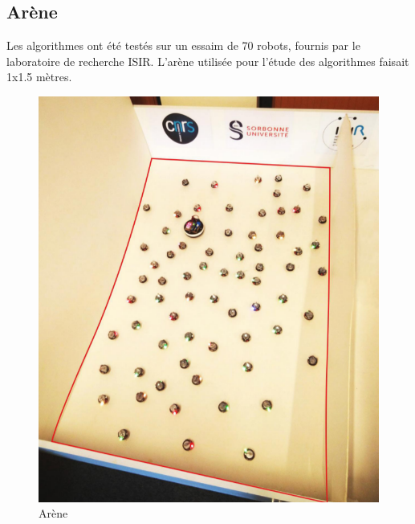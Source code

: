 \documentclass[a4paper]{article}
\begin{document}
\subsection{Arène}
Les algorithmes ont été testés sur un essaim de 70 robots, fournis par le laboratoire de recherche ISIR. L'arène utilisée pour l'étude des algorithmes faisait 1x1.5 mètres.\\
\begin{figure}[h]
	\begin{center}
		\centering
		\includegraphics[scale=0.4,angle=-90]{../../script_results/arene.png}
		\caption{Arène}
	\end{center}
\end{figure} \\
\end{document}
